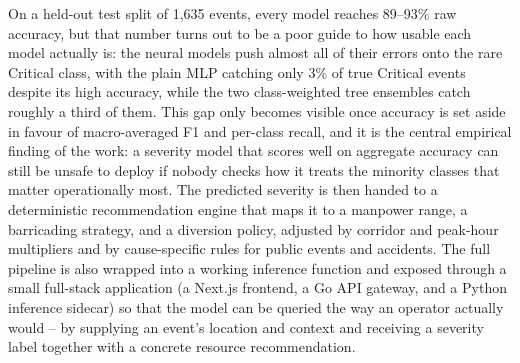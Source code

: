 \documentclass[12pt,phd,times]{pkmthesis}
\begin{document}
{{{{\vspace{0.3cm}
On a held-out test split of 1{,}635 events, every model reaches 89--93\% raw accuracy, but that number turns out to be a poor guide to how usable each model actually is: the neural models push almost all of their errors onto the rare Critical class, with the plain MLP catching only 3\% of true Critical events despite its high accuracy, while the two class-weighted tree ensembles catch roughly a third of them. This gap only becomes visible once accuracy is set aside in favour of macro-averaged F1 and per-class recall, and it is the central empirical finding of the work: a severity model that scores well on aggregate accuracy can still be unsafe to deploy if nobody checks how it treats the minority classes that matter operationally most. The predicted severity is then handed to a deterministic recommendation engine that maps it to a manpower range, a barricading strategy, and a diversion policy, adjusted by corridor and peak-hour multipliers and by cause-specific rules for public events and accidents. The full pipeline is also wrapped into a working inference function and exposed through a small full-stack application (a Next.js frontend, a Go API gateway, and a Python inference sidecar) so that the model can be queried the way an operator actually would -- by supplying an event's location and context and receiving a severity label together with a concrete resource recommendation.

	}}}}
\thispagestyle{empty}
\clearpage
\end{document}
